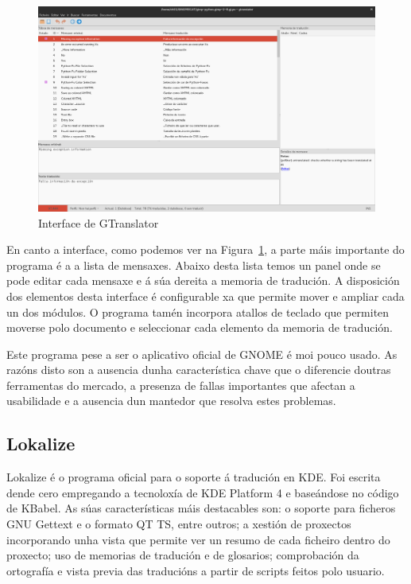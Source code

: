 \begin{figure}[h]
    \centering
    \includegraphics[width=\textwidth]{img/captura_gtranslator.png}
    \caption[Interface de GTranslator]{Interface de GTranslator}
    \label{fig:gtranslator}
\end{figure}

En canto a interface, como podemos ver na Figura~\ref{fig:gtranslator}, a parte máis importante do programa é a a lista de mensaxes. Abaixo desta lista temos un panel onde se pode editar cada mensaxe e á súa dereita a memoria de tradución. A disposición dos elementos desta interface é configurable xa que permite mover e ampliar cada un dos módulos. O programa tamén incorpora atallos de teclado que permiten moverse polo documento e seleccionar cada elemento da memoria de tradución.

Este programa pese a ser o aplicativo oficial de GNOME é moi pouco usado. As razóns disto son a ausencia dunha característica chave que o diferencie doutras ferramentas do mercado, a presenza de fallas importantes que afectan a usabilidade e a ausencia dun mantedor que resolva estes problemas.

\subsection{Lokalize}
Lokalize é o programa oficial para o soporte á tradución en KDE. Foi escrita dende cero empregando a tecnoloxía de KDE Platform 4 e baseándose no código de KBabel. As súas características máis destacables son: o soporte para ficheros GNU Gettext e o formato QT TS, entre outros; a xestión de proxectos incorporando unha vista que permite ver un resumo de cada ficheiro dentro do proxecto; uso de memorias de tradución e de glosarios; comprobación da ortografía e vista previa das traducións a partir de scripts feitos polo usuario.

